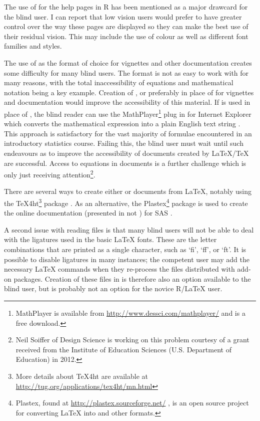 The use of \html{} for the help pages in R has been mentioned as a major drawcard for the blind user. I can report that low vision users would prefer to have greater control over the way these pages are displayed so they can make the best use of their residual vision. This may include the use of colour as well as different font families and styles.

The use of \pdf{} as the format of choice for vignettes and other documentation creates some difficulty for many blind users. The \pdf{} format is not as easy to work with for many reasons, with the total inaccessibility of equations and mathematical notation being a key example. Creation of \html{}, or preferably \xml{} in place of \pdf{} for vignettes and documentation would improve the accessibility of this material. If \xml{} is used in place of \html{}, the blind reader can use the MathPlayer\footnote{MathPlayer is available from \url{http://www.dessci.com/mathplayer/} and is a free download.} plug in for Internet Explorer which converts the mathematical expression into a plain English text string \citep{Soiffer2005}. This approach is satisfactory for the vast majority of formulae encountered in an introductory statistics course. Failing this, the blind user must wait until such endeavours as \cite{Moore2009} to improve the accessibility of \pdf{} documents created by \LaTeX{}/\TeX{} are successful. Access to equations in \pdf{} documents  is a further challenge which is only just receiving attention\footnote{Neil Soiffer of Design Science is working on this problem courtesy of a grant  received from the Institute of Education Sciences (U.S. Department of Education) in 2012.}.

There are several ways to create either \html{} or \xml{} documents from \LaTeX{}, notably using the \TeX{}4ht\footnote{More details about \TeX{}4ht are available at \url{http://tug.org/applications/tex4ht/mn.html}} package \citep{TeX4ht}. As an alternative, the Plastex\footnote{Plastex, found at \url{http://plastex.sourceforge.net/} \citep{Plastex}, is an open source project for converting \LaTeX{} into {\sc \html{}} and other formats.} package is used to create the online documentation (presented in \html{} not \pdf{}) for SAS \citep{SAS}. 

A second issue with reading \pdf{} files is that many blind users will not be able to deal with the ligatures used in the basic \LaTeX{} fonts. These are the letter combinations that are printed as a single character, such as `fi', `ff', or `ft'. It is possible to disable ligatures in many instances; the competent user may add the necessary \LaTeX{} commands when they re-process the files distributed with add-on packages. Creation of these files in \html{} is therefore also an option available to the blind user, but is probably not an option for the novice R/\LaTeX{} user.

